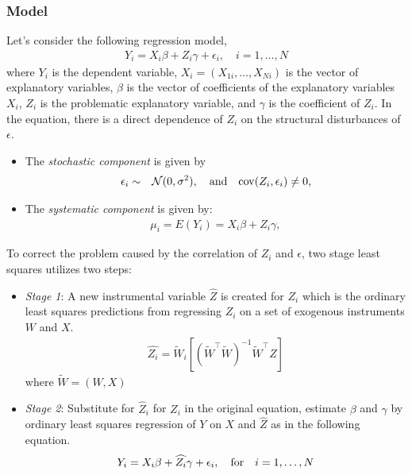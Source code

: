 \subsubsection{Model}
Let's consider the following regression model,
\begin{eqnarray*}
Y_i=X_i\beta + Z_i\gamma + \epsilon_i, \quad  i=1,\ldots,N
\end{eqnarray*}
where $Y_i$ is the dependent variable, 
$X_i = (X_{1i},\ldots, X_{Ni})$ is the vector of explanatory variables, 
$\beta$ is the vector of coefficients of the explanatory variables $X_i$, 
$Z_i$ 
is the problematic explanatory variable, and $\gamma$ is the coefficient
 of $Z_i$.  In the equation, there is a direct dependence of $Z_i$ 
on the structural disturbances of $\epsilon$.
\begin{itemize}
\item The \emph{stochastic component} is given by
\begin{eqnarray*}
\epsilon_i  &  \sim & {\cal N}(0, \sigma^2), \quad {\rm and} \quad
{\rm cov}(Z_i, \epsilon_i) \ne 0,
\end{eqnarray*}
\item The \emph{systematic component} is given by:
\begin{eqnarray*}
\mu_{i}= E(Y_i)= X_{i}\beta + Z_i\gamma,
\end{eqnarray*}
\end{itemize}
\noindent To correct the problem caused by the correlation of $Z_i$ and $\epsilon$, 
two stage least squares utilizes two steps:
\begin{itemize}
\item \emph{Stage 1}: A new instrumental variable $\hat{Z}$ is created 
for $Z_i$ which is the ordinary least squares predictions from regressing 
$Z_i$ on a set of exogenous instruments $W$ and $X$.
\begin{eqnarray*}
\widehat{Z_i} = \widetilde{W}_i[(\widetilde{W}^\top\widetilde{W})^{-1}\widetilde{W}^\top Z]
\end{eqnarray*}
where $\widetilde{W} = (W,X)$
\item \emph{Stage 2}: Substitute for $\hat{Z}_i$ for $Z_i$ in the original 
equation, estimate $\beta$ and $\gamma$ by ordinary least squares regression
of $Y$ on $X$ and $\hat{Z}$ as in the following equation. 
\begin{eqnarray*}
Y_i=X_i\beta + \widehat{Z_i}\gamma + \epsilon_i,  \quad {\rm for} 
\quad   i=1,\ldots,N
\end{eqnarray*}
\end{itemize}
